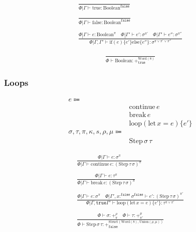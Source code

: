 \documentclass {article}
\begin{document}
\begin{gather*}
\frac
{}
{ \Phi | \Gamma \vdash \text{true} : \text{Boolean}^\texttt{false}} \\
\\
\frac
{}
{ \Phi | \Gamma \vdash \text{false} : \text{Boolean}^\texttt{false}} \\
\\
\frac
{\Phi | \Gamma \vdash e : \text{Boolean}^\pi \quad \Phi | \Gamma' \vdash e' : \sigma^{\pi'} \quad \Phi | \Gamma' \vdash e'' : \sigma^{\pi''} }
{\Phi | \Gamma, \Gamma' \vdash \text{if} (e) \{ e' \} \text{else} \{ e'' \} : \sigma^{\pi \lor \pi' \lor \pi''} }
\end{gather*}

\begin{gather*}
\frac
{}
{ \Phi \vdash \text{Boolean} : +^{\text{Word}(8)}_\texttt{true}}
\end{gather*}

\subsubsection{Loops}
\begin{align*}
e \Coloneqq & \\
& \text{continue} \, e \tag{continue} \\
& \text{break} \, e \tag{break} \\
& \text{loop} (\text{let} \, x = e) \{ e' \} \tag{loop} \\
\sigma, \tau, \pi, \kappa, s, \rho, \mu \Coloneqq & \\
& \text{Step} \, \sigma \, \tau \tag{Loop Instruction}
\end{align*}

\begin{gather*}
\frac
{\Phi | \Gamma \vdash e : \sigma^\pi }
{\Phi | \Gamma \vdash \text{continue} \, e : (\text{Step} \, \tau \, \sigma)^\pi } \\
\\
\frac
{\Phi | \Gamma \vdash e : \tau^\pi }
{\Phi | \Gamma \vdash \text{break} \, e : (\text{Step} \, \tau \, \sigma)^\pi } \\
\\
\frac
{\Phi | \Gamma \vdash e : \sigma^\pi \quad \Phi | \Gamma', x :^\texttt{false} \sigma^\texttt{false} \vdash e' : (\text{Step} \, \tau \, \sigma)^{\pi'} }
{\Phi | \Gamma, \texttt{true} \Gamma' \vdash \text{loop} (\text{let} \, x = e) \{ e' \} : \tau^{\pi \lor \pi'} } \\
\\
\frac
{\Phi \vdash \sigma : +^{\rho}_{\pi} \quad \Phi \vdash \tau : +^{\mu}_{\pi'} }
{\Phi \vdash \text{Step} \, \sigma \, \tau : +^{\text{Struct} (\text{Word} (8), \text{Union} (\rho, \mu) ) }_\texttt{false} }
\end{gather*}
\end{document}
